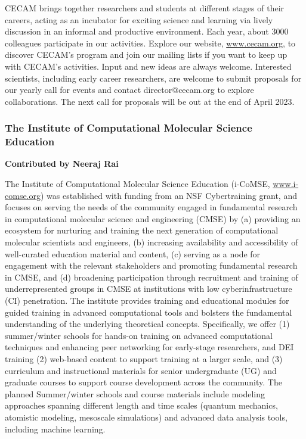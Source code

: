 \documentclass[9pt,review]{livecoms}
\begin{document}
CECAM brings together researchers and students at different stages of their careers, acting as an incubator for exciting science and learning via lively discussion in an informal and productive environment. 
Each year, about 3000 colleagues participate in our activities. 
Explore our website, \href{https://www.cecam.org/}{www.cecam.org}, to discover CECAM’s program and join our mailing lists if you want to keep up with CECAM’s activities. 
Input and new ideas are always welcome. 
Interested scientists, including early career researchers, are welcome to submit proposals for our yearly call for events and contact director@cecam.org to explore collaborations. 
The next call for proposals will be out at the end of April 2023.


\subsubsection{The Institute of Computational Molecular Science Education}

\textbf{Contributed by Neeraj Rai}

The Institute of Computational Molecular Science Education (i-CoMSE, \href{www.i-comse.org}{www.i-comse.org}) was established with funding from an NSF Cybertraining grant, and focuses on serving the needs of the community engaged in fundamental research in computational molecular science and engineering (CMSE) by (a) providing an ecosystem for nurturing and training the next generation of computational molecular scientists and engineers, (b) increasing availability and accessibility of well-curated education material and content, (c) serving as a node for engagement with the relevant stakeholders and promoting fundamental research in CMSE, and (d) broadening participation through recruitment and training of underrepresented groups in CMSE at institutions with low cyberinfrastructure (CI) penetration. 
The institute provides training and educational modules for guided training in advanced computational tools and bolsters the fundamental understanding of the underlying theoretical concepts. Specifically, we offer (1) summer/winter schools for hands-on training on advanced computational techniques and enhancing peer networking for early-stage researchers, and DEI training (2) web-based content to support training at a larger scale, and (3) curriculum and instructional materials for senior undergraduate (UG) and graduate courses to support course development across the community. The planned Summer/winter schools and course materials include modeling approaches spanning different length and time scales (quantum mechanics, atomistic modeling, mesoscale simulations) and advanced data analysis tools, including machine learning. 
\end{document}

